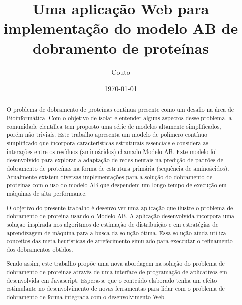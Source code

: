 \documentclass[dm,ppgcomp]{texfurg}
\title{Uma aplica{\c{c}}{\~a}o Web para implementa{\c{c}}{\~a}o do modelo AB de dobramento de prote{\'i}­nas}
\author{Couto}{Rafael Castro do}
\date{\today}
\begin{document}
\maketitle

\begin{abstract}

O problema de dobramento de proteínas continua presente como um desafio na área de Bioinformática. Com o objetivo de isolar e entender alguns aspectos desse problema, a comunidade científica tem proposto uma série de modelos altamente simplificados, porém não triviais. Este trabalho apresenta um modelo de polímero contínuo simplificado que incorpora características estruturais essenciais e considera as interações entre os resíduos (aminoácidos) chamado Modelo AB. Este modelo foi desenvolvido para explorar a adaptação de redes neurais na predição de padrões de dobramento de proteínas na forma de estrutura primária (sequência de aminoácidos). Atualmente existem diversas implementações para a solução do dobramento de proteínas com o uso do modelo AB que despendem um longo tempo de execução em máquinas de alta performance. 

O objetivo do presente trabalho é desenvolver uma aplicação que ilustre o problema de dobramento de proteína usando o Modelo AB. A aplicação desenvolvida incorpora uma soluçao inspirada nos algoritmos de estimação de distribuição e em estratégias de aprendizagem de máquina para a busca da solução ótima. Essa solução ainda utiliza conceitos das meta-heurísticas de arrefecimento simulado para execcutar o refinamento dos dobramentos obtidos.

Sendo assim, este trabalho propõe uma nova abordagem na solução do problema de dobramento de proteínas através de uma interface de programação de aplicativos em desenvolvida em Javascript. Espera-se que o conteúdo elaborado tenha um efeito estimulante no desenvolvimento de novas ferramentas para lidar com o problema de dobramento de forma integrada com o desenvolvimento Web.

\end{abstract}
\end{document}
